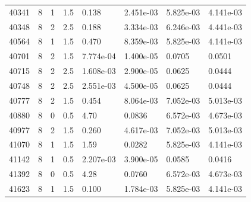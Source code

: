 \documentclass[preview]{standalone}
\begin{document}
{{{{{{{\begin{tabular}{L{1.2cm}C{1.2cm} C{0.3cm}C{0.5cm} C{1.4cm}C{1.4cm} C{1.4cm}C{1.4cm}}
  40341  &     8  & 1     & 1.5 &  0.138  & 2.451e-03  & 5.825e-03 &  4.141e-03   \\ 
  40348  &     8  & 2     & 2.5 &  0.188  & 3.334e-03  & 6.246e-03 &  4.441e-03   \\ 
  40564  &     8  & 1     & 1.5 &  0.470  & 8.359e-03  & 5.825e-03 &  4.141e-03   \\ 
  40701  &     8  & 2     & 1.5 &  7.774e-04  & 1.400e-05  & 0.0705 &  0.0501   \\ 
  40715  &     8  & 2     & 2.5 &  1.608e-03  & 2.900e-05  & 0.0625 &  0.0444   \\ 
  40748  &     8  & 2     & 2.5 &  2.551e-03  & 4.500e-05  & 0.0625 &  0.0444   \\ 
  40777  &     8  & 2     & 1.5 &  0.454  & 8.064e-03  & 7.052e-03 &  5.013e-03   \\ 
  40880  &     8  & 0     & 0.5 &  4.70  & 0.0836  & 6.572e-03 &  4.673e-03   \\ 
  40977  &     8  & 2     & 1.5 &  0.260  & 4.617e-03  & 7.052e-03 &  5.013e-03   \\ 
  41070  &     8  & 1     & 1.5 &  1.59  & 0.0282  & 5.825e-03 &  4.141e-03   \\ 
  41142  &     8  & 1     & 0.5 &  2.207e-03  & 3.900e-05  & 0.0585 &  0.0416   \\ 
  41392  &     8  & 0     & 0.5 &  4.28  & 0.0760  & 6.572e-03 &  4.673e-03   \\ 
  41623  &     8  & 1     & 1.5 &  0.100  & 1.784e-03  & 5.825e-03 &  4.141e-03   \\ 
\hline 
\end{tabular} 

}}}}}}}
\end{document}
